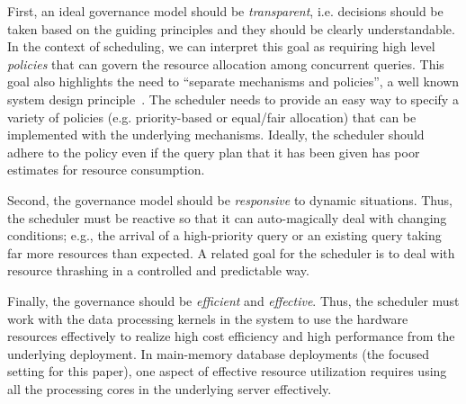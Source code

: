 First, an ideal governance model should be \textit{transparent}, i.e. decisions should be taken based on the guiding principles and they should be clearly understandable.
In the context of scheduling, we can interpret this goal as requiring high level \textit{policies} that can govern the resource allocation among concurrent queries. 
This goal also highlights the need to ``separate mechanisms and policies'', a well known system design principle~\cite{LampsonS76}.
The scheduler needs to provide an easy way to specify a variety of policies (e.g. priority-based or equal/fair allocation) that can be implemented with the underlying mechanisms.
Ideally, the scheduler should adhere to the policy even if the query plan that it has been given has poor estimates for resource consumption.

Second, the governance model should be \textit{responsive} to dynamic situations. %
Thus, the scheduler must be reactive so that it can auto-magically deal with changing conditions; e.g., the arrival of a high-priority query or an existing query taking far more resources than expected. 
A related goal for the scheduler is to deal with resource thrashing in a controlled and predictable way.

Finally, the governance should be \textit{efficient} and \textit{effective}. 
Thus, the scheduler must work with the data processing kernels in the system to use the hardware resources effectively to realize high cost efficiency and high performance from the underlying deployment. 
In main-memory database deployments (the focused setting for this paper), one aspect of effective resource utilization requires using all the processing cores in the underlying server effectively. 


